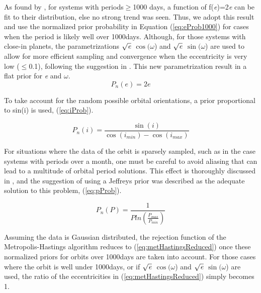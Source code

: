 \documentclass[12pt,preprint]{aastex}
\begin{document}
As found by \citet{duquennoy1991}, for systems with periods$\geq$1000 days, a function of f({\it e})=2{\it e} can be fit to their distribution, else no strong trend was seen.  Thus, we adopt this result and use the normalized prior probability in Equation (\ref{eq:eProb1000}) for cases when the period is likely well over 1000days.  Although, for those systems with close-in planets, the parametrizations $\sqrt{{\it e}}$ $\cos(\omega$) and $\sqrt{{\it e}}$ $\sin(\omega$) are used to allow for more efficient sampling and convergence when the eccentricity is very low ($\le$0.1), following the suggestion in \citet{albrecht2012}. This new parametrization result in a flat prior for {\it e} and $\omega$.
\begin{equation}\label{eq:eProb1000}
P_n(e) =  2e
\end{equation}

 
To take account for the random possible orbital orientations, a prior proportional to sin(i) is used, (\ref{eq:iProb}).

\begin{equation}\label{eq:iProb}
P_n(i) =  \frac{\sin(i)}{\cos(i_{min})-\cos(i_{max})}
\end{equation}

For situations where the data of the orbit is sparsely sampled, such as in the case systems with periods over a month, one must be careful to avoid aliasing that can lead to a multitude of orbital period solutions.  This effect is thoroughly discussed in \citet{gregory2005}, and the suggestion of using a Jeffreys prior was described as the adequate solution to this problem, (\ref{eq:pProb}).

\begin{equation}\label{eq:pProb}
P_n(P) =  \frac{1}{P ln(\frac{P_{max}}{P_{min}})}
\end{equation}

Assuming the data is Gaussian distributed, the rejection function of the Metropolis-Hastings algorithm reduces to (\ref{eq:metHastingsReduced}) once these normalized priors for orbits over 1000days are taken into account.  For those cases where the orbit is well under 1000days, or if $\sqrt{{\it e}}$ $\cos(\omega$) and $\sqrt{{\it e}}$ $\sin(\omega$) are used, the ratio of the eccentricities in (\ref{eq:metHastingsReduced}) simply becomes 1.
\end{document}
